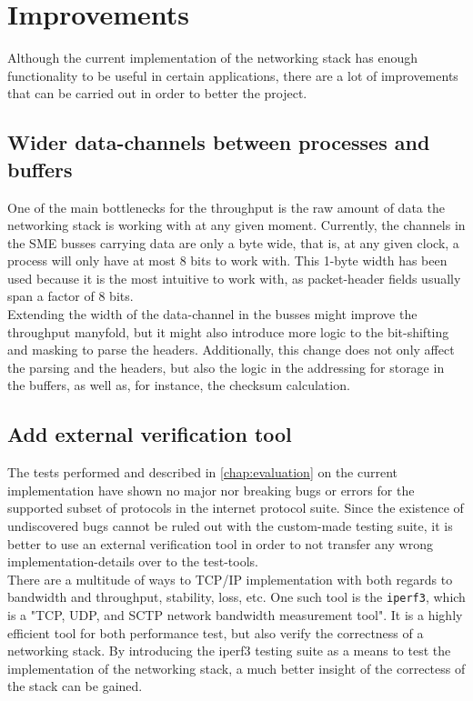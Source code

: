 \section{Improvements}
Although the current implementation of the networking stack has enough
functionality to be useful in certain applications, there are a lot of
improvements that can be carried out in order to better the project.


\subsection{Wider data-channels between processes and buffers}
One of the main bottlenecks for the throughput is the raw amount of data the
networking stack is working with at any given moment. Currently, the channels in
the SME busses carrying data are only a byte wide, that is, at any given clock,
a process will only have at most 8 bits to work with.
This 1-byte width has been used because it is the most intuitive to work with,
as packet-header fields usually span a factor of 8 bits.\\
Extending the width of the data-channel in the busses might improve the
throughput manyfold, but it might also introduce more logic to the bit-shifting
and masking to parse the headers. Additionally, this change does not only affect
the parsing and the headers, but also the logic in the addressing for storage
in the buffers, as well as, for instance, the checksum calculation.

\subsection{Add external verification tool}
The tests performed and described in \autoref{chap:evaluation} on the
current implementation have shown no major nor breaking bugs or errors for
the supported subset of protocols in the internet protocol suite.
Since the existence of undiscovered bugs cannot be ruled out with the
custom-made testing suite, it is better to use an external verification tool in
order to not transfer any wrong implementation-details over to the
test-tools.\\
There are a multitude of ways to TCP/IP implementation with both regards to
bandwidth and throughput, stability, loss, etc.
One such tool is the \texttt{iperf3}, which is a "TCP, UDP, and SCTP network
bandwidth measurement tool"\cite{iperf3}. It is a highly efficient tool for
both performance test, but also verify the correctness of a networking stack.
By introducing the iperf3 testing suite as a means to test the implementation of the networking
stack, a much better insight of the correctess of the stack can be gained.


